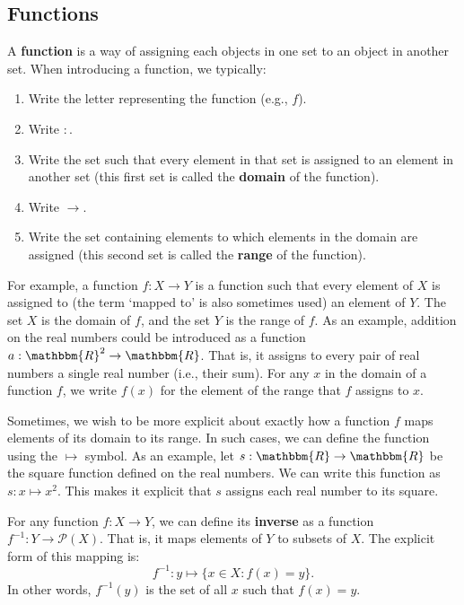 \documentclass[11pt]{article}
\theoremstyle{definition}
\theoremstyle{remark}
\begin{document}
\subsection{Functions}
A \textbf{function} is a way of assigning each objects in one set to an object in another set. When introducing a function, we typically:
\begin{enumerate}
    \item Write the letter representing the function (e.g., $f$).

    \item Write $:$.

    \item Write the set such that every element in that set is assigned to an element in another set (this first set is called the \textbf{domain} of the function).

    \item Write $\rightarrow$. 

    \item Write the set containing elements to which elements in the domain are assigned (this second set is called the \textbf{range} of the function).
\end{enumerate}
For example, a function $f:X\rightarrow Y$ is a function such that every element of $X$ is assigned to (the term `mapped to' is also sometimes used) an element of $Y$. The set $X$ is the domain of $f$, and the set $Y$ is the range of $f$. As an example, addition on the real numbers could be introduced as a function $a:\mathbbm{R}^{2}\rightarrow \mathbbm{R}$. That is, it assigns to every pair of real numbers a single real number (i.e., their sum). For any $x$ in the domain of a function $f$, we write $f(x)$ for the element of the range that $f$ assigns to $x$.\par

Sometimes, we wish to be more explicit about exactly how a function $f$ maps elements of its domain to its range. In such cases, we can define the function using the $\mapsto$ symbol. As an example, let $s:\mathbbm{R}\rightarrow\mathbbm{R}$ be the square function defined on the real numbers. We can write this function as $s:x\mapsto x^{2}$. This makes it explicit that $s$ assigns each real number to its square.\par 

For any function $f:X\rightarrow Y$, we can define its \textbf{inverse} as a function $f^{-1}:Y\rightarrow\mathcal{P}(X)$. That is, it maps elements of $Y$ to subsets of $X$. The explicit form of this mapping is: $$f^{-1}:y\mapsto\{x\in X: f(x)=y\}.$$ In other words, $f^{-1}(y)$ is the set of all $x$ such that $f(x)=y$.\par 
\end{document}
